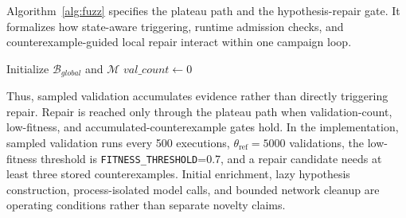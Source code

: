 \documentclass[final,5p,times,number]{elsarticle}
\begin{document}
Algorithm~\ref{alg:fuzz} specifies the plateau path and the hypothesis-repair gate. It formalizes how state-aware triggering, runtime admission checks, and counterexample-guided local repair interact within one campaign loop.

\begin{algorithm}[!htbp]
\caption{Runtime-Validated Plateau\\Recovery}
\label{alg:fuzz}
\SetAlgoLined
{}
\footnotesize
\DontPrintSemicolon
{}
Initialize $\mathcal{B}_{global}$ and $\mathcal{M}$\;
$val\_count \leftarrow 0$\;
\end{algorithm}

Thus, sampled validation accumulates evidence rather than directly triggering repair. Repair is reached only through the plateau path when validation-count, low-fitness, and accumulated-counterexample gates hold. In the implementation, sampled validation runs every 500 executions, $\theta_{\mathrm{ref}}=5000$ validations, the low-fitness threshold is \texttt{FITNESS\_THRESHOLD}=0.7, and a repair candidate needs at least three stored counterexamples. Initial enrichment, lazy hypothesis construction, process-isolated model calls, and bounded network cleanup are operating conditions rather than separate novelty claims.
\end{document}

